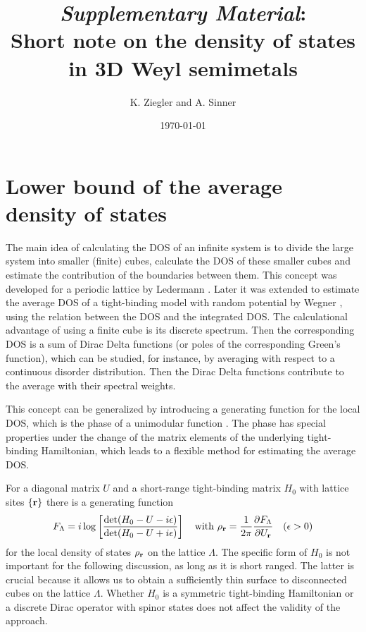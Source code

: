 \documentclass[aps]{revtex4}
\def\beq{\begin{equation}}
\def\eeq{\end{equation}}
\def\br{{\bf r}}
\begin{document}
\title{{\it Supplementary Material}:\\
Short note on the density of states in 3D Weyl semimetals
}

\author{K. Ziegler and A. Sinner}
\date{\today}

\maketitle

\section{Lower bound of the average density of states}
\label{sect:lower_bound}

The main idea of calculating the DOS of an infinite system is to divide the large system into 
smaller (finite) cubes, calculate the DOS of these smaller
cubes and estimate the contribution of the boundaries between them. This concept was 
developed for a periodic lattice by Ledermann \cite{ledermann44}. Later it was extended 
to estimate the average DOS of a tight-binding model with random potential by Wegner \cite{wegner81}, 
using the relation between
the DOS and the integrated DOS. The calculational advantage of using a finite cube is its discrete
spectrum. Then the corresponding DOS is a sum of Dirac Delta functions (or poles of the corresponding
Green's function), which can be studied, for instance, by averaging with respect to a continuous 
disorder distribution. Then the Dirac Delta functions contribute to the average with their 
spectral weights.

This concept can be generalized by introducing a generating function for the local DOS,  
which is the phase of a unimodular function \cite{ziegler87,ziegler88,ziegler98}. The phase has special 
properties under the change of the matrix elements of the underlying tight-binding Hamiltonian, 
which leads to a flexible method for estimating the average DOS. 

For a diagonal matrix $U$ and a short-range tight-binding matrix $H_0$ with lattice sites $\{\br\}$
there is a generating function 
\beq
F_\Lambda=i\log\left[\frac{\det(H_0-U-i\epsilon)}{\det(H_0-U+i\epsilon)}\right]
\ \ \ {\rm with}\ 
\rho_\br=\frac{1}{2\pi}\frac{\partial F_\Lambda}{\partial U_\br}
\ \ \ (\epsilon>0)
\label{def_F}
\eeq
for the local density of states $\rho_\br$ on the lattice $\Lambda$. 
The specific form of $H_0$ is not important for the following discussion, as long as it
is short ranged. The latter is crucial because it allows us to obtain a sufficiently
thin surface to disconnected cubes on the lattice $\Lambda$. Whether $H_0$ is a symmetric
tight-binding Hamiltonian or a discrete Dirac operator with spinor states does not affect
the validity of the approach.
\end{document}
